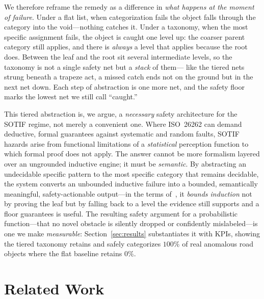 \documentclass[conference]{IEEEtran}
\begin{document}
We therefore reframe the remedy as a difference in \emph{what happens at the
moment of failure}. Under a flat list, when categorization fails the object falls
through the category into the void---nothing catches it. Under a taxonomy, when
the most specific assignment fails, the object is caught one level up: the coarser
parent category still applies, and there is \emph{always} a level that applies
because the root does. Between the leaf and the root sit several intermediate
levels, so the taxonomy is not a single safety net but a \emph{stack} of them---
like the tiered nets strung beneath a trapeze act, a missed catch ends not on the
ground but in the next net down. Each step of abstraction is one more net, and the
safety floor marks the lowest net we still call ``caught.''

This tiered abstraction is, we argue, a \emph{necessary} safety architecture for
the SOTIF regime, not merely a convenient one. Where ISO~26262 can demand
deductive, formal guarantees against systematic and random faults, SOTIF hazards
arise from functional limitations of a \emph{statistical} perception function to
which formal proof does not apply. The answer cannot be more formalism layered
over an ungrounded inductive engine; it must be \emph{semantic}. By abstracting an
undecidable specific pattern to the most specific category that remains decidable,
the system converts an unbounded inductive failure into a bounded, semantically
meaningful, safety-actionable output---in the terms of~\cite{schaller_patterns},
it \emph{bounds induction} not by proving the leaf but by falling back to a level
the evidence still supports and a floor guarantees is useful. The resulting safety
argument for a probabilistic function---that no novel obstacle is silently dropped
or confidently mislabeled---is one we make \emph{measurable}: Section~\ref{sec:results}
substantiates it with KPIs, showing the tiered taxonomy retains and safely
categorizes $100\%$ of real anomalous road objects where the flat baseline retains
$0\%$.

\section{Related Work}
\label{sec:related}
\end{document}
